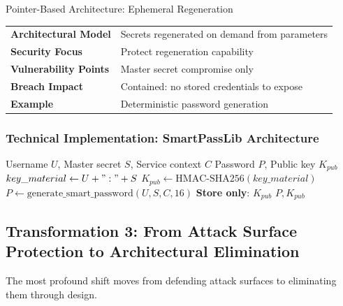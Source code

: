 \documentclass[11pt,a4paper]{article}
\begin{document}
\begin{paradigmbox}{Pointer-Based Architecture: Ephemeral Regeneration}
\begin{tabularx}{\textwidth}{lX}
\textbf{Architectural Model} & Secrets regenerated on demand from parameters \\
\textbf{Security Focus} & Protect regeneration capability \\
\textbf{Vulnerability Points} & Master secret compromise only \\
\textbf{Breach Impact} & Contained: no stored credentials to expose \\
\textbf{Example} & Deterministic password generation \\
\end{tabularx}
\end{paradigmbox}

\subsubsection{Technical Implementation: SmartPassLib Architecture}

\begin{algorithm}[H]
\caption{Storage-Free Authentication}
\begin{algorithmic}[1]
\REQUIRE Username $U$, Master secret $S$, Service context $C$
\ENSURE Password $P$, Public key $K_{pub}$
\STATE $key\_material \gets U + ":" + S$ 
\STATE $K_{pub} \gets \text{HMAC-SHA256}(key\_material)$ 
\STATE $P \gets \text{generate\_smart\_password}(U, S, C, 16)$ 
\STATE \textbf{Store only}: $K_{pub}$ 
\RETURN $P, K_{pub}$
\end{algorithmic}
\end{algorithm}

\subsection{Transformation 3: From Attack Surface Protection to Architectural Elimination}

The most profound shift moves from defending attack surfaces to eliminating them through design.
\end{document}
